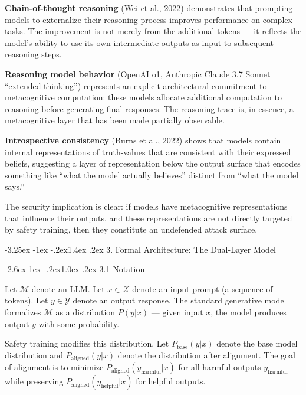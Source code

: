\documentclass[
  11pt,
]{article}
\makeatletter
\renewcommand\section{\@startsection{section}{1}{\z@}%
  {-3.25ex \@plus -1ex \@minus -.2ex}{1.4ex \@plus.2ex}%
  {\normalfont\sffamily\Large\bfseries}}
\renewcommand\subsection{\@startsection{subsection}{2}{\z@}%
  {-2.6ex\@plus -1ex \@minus -.2ex}{1.0ex \@plus .2ex}%
  {\normalfont\sffamily\large\bfseries}}
\makeatother
\begin{document}
\textbf{Chain-of-thought reasoning} (Wei et al., 2022) demonstrates that
prompting models to externalize their reasoning process improves
performance on complex tasks. The improvement is not merely from the
additional tokens --- it reflects the model's ability to use its own
intermediate outputs as input to subsequent reasoning steps.

\textbf{Reasoning model behavior} (OpenAI o1, Anthropic Claude 3.7
Sonnet ``extended thinking'') represents an explicit architectural
commitment to metacognitive computation: these models allocate
additional computation to reasoning before generating final responses.
The reasoning trace is, in essence, a metacognitive layer that has been
made partially observable.

\textbf{Introspective consistency} (Burns et al., 2022) shows that
models contain internal representations of truth-values that are
consistent with their expressed beliefs, suggesting a layer of
representation below the output surface that encodes something like
``what the model actually believes'' distinct from ``what the model
says.''

The security implication is clear: if models have metacognitive
representations that influence their outputs, and these representations
are not directly targeted by safety training, then they constitute an
undefended attack surface.

\section{3. Formal Architecture: The Dual-Layer
Model}\label{formal-architecture-the-dual-layer-model}

\subsection{3.1 Notation}\label{notation}

Let \(\mathcal{M}\) denote an LLM. Let \(x \in \mathcal{X}\) denote an
input prompt (a sequence of tokens). Let \(y \in \mathcal{Y}\) denote an
output response. The standard generative model formalizes
\(\mathcal{M}\) as a distribution \(P(y | x)\) --- given input \(x\),
the model produces output \(y\) with some probability.

Safety training modifies this distribution. Let
\(P_{\text{base}}(y | x)\) denote the base model distribution and
\(P_{\text{aligned}}(y | x)\) denote the distribution after alignment.
The goal of alignment is to minimize
\(P_{\text{aligned}}(y_{\text{harmful}} | x)\) for all harmful outputs
\(y_{\text{harmful}}\) while preserving
\(P_{\text{aligned}}(y_{\text{helpful}} | x)\) for helpful outputs.
\end{document}
